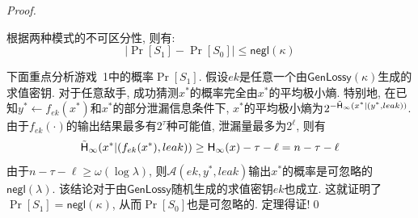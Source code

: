 \begin{proof}
\begin{trivlist}
\item 根据两种模式的不可区分性, 则有: 
\begin{equation*}
    |\Pr[S_1] - \Pr[S_0]| \leq \mathsf{negl}(\kappa)
\end{equation*} 
\end{trivlist}
下面重点分析游戏~1中的概率$\Pr[S_1]$. 假设$ek$是任意一个由$\mathsf{GenLossy}(\kappa)$生成的求值密钥. 对于任意敌手, 成功猜测$x^*$的概率完全由$x^*$的平均极小熵. 特别地, 在已知$y^* \leftarrow f_{ek}(x^*)$和$x^*$的部分泄漏信息条件下, $x^*$的平均极小熵为$2^{-\tilde{\mathsf{H}}_\infty(x^*|(y^*, leak))}$. 由于$f_{ek}(\cdot)$的输出结果最多有$2^\tau$种可能值, 泄漏量最多为$2^\ell$, 则有
    \begin{equation*}
        \tilde{\mathsf{H}}_\infty(x^*|(f_{ek}(x^*), leak)) \geq \mathsf{H}_\infty(x) - \tau - \ell = n - \tau - \ell
    \end{equation*} 
由于$n - \tau - \ell \geq \omega(\log \lambda)$, 则$\mathcal{A}(ek, y^*, leak)$输出$x^*$的概率是可忽略的$\mathsf{negl}(\lambda)$. 该结论对于由$\mathsf{GenLossy}$随机生成的求值密钥$ek$也成立. 这就证明了$\Pr[S_1] = \mathsf{negl}(\kappa)$, 从而$\Pr[S_0]$也是可忽略的. 定理得证!\qed 
\end{proof}


